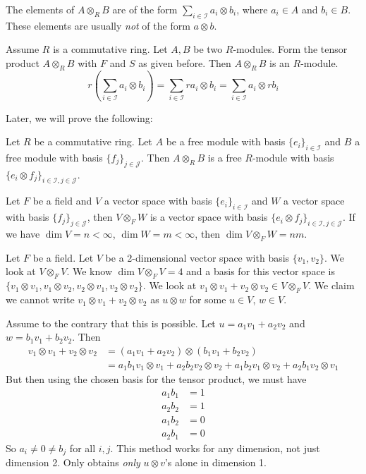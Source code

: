 \begin{rem}
The elements of $A \otimes_R B$ are of the form $\sum_{i \in \mathcal{I}} a_i \otimes b_i$, where $a_i \in A$ and $b_i \in B$. These elements are usually \emph{not} of the form $a \otimes b$. 
\end{rem}

\begin{rem}
Assume $R$ is a commutative ring. Let $A,B$ be two $R$-modules. Form the tensor product $A \otimes_R B$ with $F$ and $S$ as given before. Then $A \otimes_R B$ is an $R$-module. 
\[
r\left( \sum_{i \in \mathcal{I}} a_i \otimes b_i \right)=\sum_{i \in \mathcal{I}} ra_i \otimes b_i=\sum_{i \in \mathcal{I}} a_i \otimes rb_i
\]
\end{rem}

Later, we will prove the following:

\begin{thm}
Let $R$ be a commutative ring. Let $A$ be a free module with basis $\{e_i\}_{i \in \mathcal{I}}$ and $B$ a free module with basis $\{f_j\}_{j \in \mathcal{J}}$. Then $A \otimes_R B$ is a free $R$-module with basis $\{e_i\otimes f_j \}_{i\in\mathcal{I},j\in\mathcal{J}}$.
\end{thm}

\begin{cor}
Let $F$ be a field and $V$ a vector space with basis $\{e_i\}_{i \in \mathcal{I}}$ and $W$ a vector space with basis $\{f_j\}_{j \in \mathcal{J}}$, then $V \otimes_F W$ is a vector space with basis $\{e_i\otimes f_j \}_{i\in\mathcal{I},j\in\mathcal{J}}$. If we have $\dim V=n<\infty$, $\dim W=m<\infty$, then $\dim V\otimes_F W=nm$.
\end{cor}

\begin{ex}
Let $F$ be a field. Let $V$ be a 2-dimensional vector space with basis $\{v_1,v_2\}$. We look at $V \otimes_F V$. We know $\dim V\otimes_F V=4$ and a basis for this vector space is $\{v_1\otimes v_1,v_1 \otimes v_2,v_2 \otimes v_1,v_2\otimes v_2\}$. We look at $v_1\otimes v_1+v_2\otimes v_2 \in V \otimes_F V$. We claim we cannot write $v_1\otimes v_1+v_2\otimes v_2$ as $u \otimes w$ for some $u \in V$, $w \in V$. 

Assume to the contrary that this is possible. Let $u=a_1v_1+a_2v_2$ and $w=b_1v_1+b_2v_2$. Then
\[
\begin{split}
v_1 \otimes v_1+v_2\otimes v_2&=(a_1v_1+a_2v_2) \otimes (b_1v_1+b_2v_2) \\
&=a_1b_1v_1 \otimes v_1+a_2b_2v_2\otimes v_2 +a_1b_2v_1\otimes v_2+a_2b_1v_2 \otimes v_1
\end{split}
\]
But then using the chosen basis for the tensor product, we must have
\[
\begin{split}
a_1b_1&=1 \\
a_2b_2&=1 \\
a_1b_2&=0 \\
a_2b_1&=0
\end{split}
\]
So $a_i \neq 0 \neq b_j$ for all $i,j$. This method works for any dimension, not just dimension 2. Only obtains \emph{only} $u\otimes v$'s alone in dimension 1. 
\end{ex}

